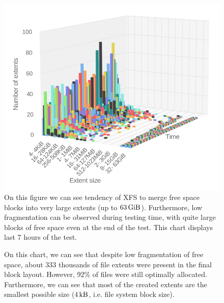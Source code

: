 \documentclass[
  color, %
  table, %
  lof,   %
  lot,   %
]{fithesis3}
\begin{document}
\begin{figure}[!htb]
        \centering
        \includegraphics[width=\textwidth]{../charts/HDD_xfs/free80.png}
        \caption[Free space fragmentation of XFS during testing of medium utilisation of HDD]{On this figure we can see tendency of XFS to merge free space blocks into very large extents (up to $\SI{63}{\gibi\byte}$). Furthermore, low fragmentation can be observed during testing time, with quite large blocks of free space even at the end of the test. This chart displays last 7 hours of the test.}
\label{fig:free80_xfs}
\end{figure}


\begin{figure}[!htb]
    \centering
    \caption[Size distribution of file extents of XFS during testing of medium utilisation of HDD]{On this chart, we can see that despite low fragmentation of free space, about 333 thousands of file extents were present in the final block layout. However, 92\% of files were still optimally allocated. Furthermore, we can see that most of the created extents are the smallest possible size ($\SI{4}{\kilo\byte}$, i.e. file system block size).}
    \label{fig:used80_xfs}
\end{figure}
\end{document}
